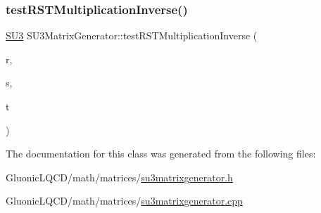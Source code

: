 \mbox{\label{class_s_u3_matrix_generator_a725f8c7882366bda7316a92c82cf4680}} 
\subsubsection{\texorpdfstring{testRSTMultiplicationInverse()}{testRSTMultiplicationInverse()}}
{\footnotesize\ttfamily \mbox{\hyperlink{class_s_u3}{S\+U3}} S\+U3\+Matrix\+Generator\+::test\+R\+S\+T\+Multiplication\+Inverse (\begin{DoxyParamCaption}\item[{\mbox{\hyperlink{class_s_u2}{S\+U2}}}]{r,  }\item[{\mbox{\hyperlink{class_s_u2}{S\+U2}}}]{s,  }\item[{\mbox{\hyperlink{class_s_u2}{S\+U2}}}]{t }\end{DoxyParamCaption})\hspace{0.3cm}{\ttfamily [inline]}}



The documentation for this class was generated from the following files\+:\begin{DoxyCompactItemize}
\item 
Gluonic\+L\+Q\+C\+D/math/matrices/\mbox{\hyperlink{su3matrixgenerator_8h}{su3matrixgenerator.\+h}}\item 
Gluonic\+L\+Q\+C\+D/math/matrices/\mbox{\hyperlink{su3matrixgenerator_8cpp}{su3matrixgenerator.\+cpp}}\end{DoxyCompactItemize}
